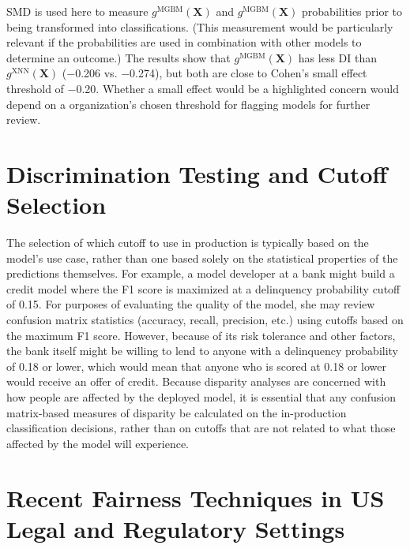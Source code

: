 \documentclass[information,article,accept,moreauthors,pdftex]{Definitions/mdpi}
\begin{document}
SMD is used here to measure $g^\text{MGBM}(\mathbf{X})$ and $g^\text{MGBM}(\mathbf{X})$ probabilities prior to being transformed into classifications.  (This measurement would be particularly relevant if the probabilities are used in combination with other models to determine an outcome.)  The results show that $g^\text{MGBM}(\mathbf{X})$ has less DI than $g^\text{XNN}(\mathbf{X})$ ($-$0.206 vs. $-$0.274), but both are close to Cohen’s small effect threshold of $-$0.20. Whether a small effect would be a highlighted concern would depend on a organization’s chosen threshold for flagging models for further review. 

\section{Discrimination Testing and Cutoff Selection}\label{a_sec:cut}

The selection of which cutoff to use in production is typically based on the model’s use case, rather than one based solely on the statistical properties of the predictions themselves.  For example, a model developer at a bank might build a credit model where the F1 score is maximized at a delinquency probability cutoff of 0.15.  For purposes of evaluating the quality of the model, she may review confusion matrix statistics (accuracy, recall, precision, etc.) using cutoffs based on the maximum F1 score. However, because of its risk tolerance and other factors, the bank itself might be willing to lend to anyone with a delinquency probability of 0.18 or lower, which would mean that anyone who is scored at 0.18 or lower would receive an offer of credit.  Because disparity analyses are concerned with how people are affected by the deployed model, it is essential that any confusion matrix-based measures of disparity be calculated on the in-production classification decisions, rather than on cutoffs that are not related to what those affected by the model will experience.

\section{Recent Fairness Techniques in US Legal and Regulatory Settings}\label{a_sec:comp}
\end{document}
